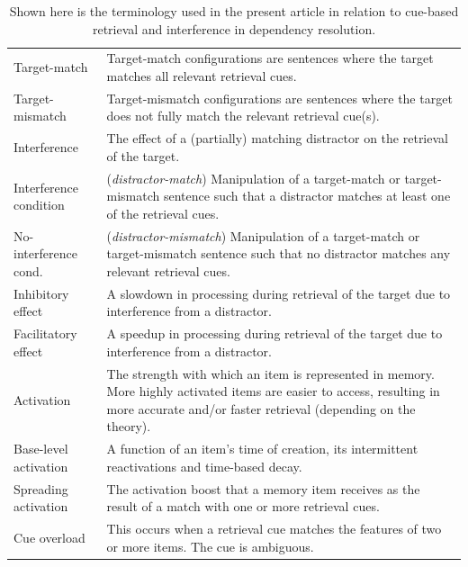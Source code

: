 \documentclass{cambridge7A}\usepackage[]{graphicx}\usepackage[]{color}
\begin{document}
\begin{subappendices}
\begin{table}[!htbp]
\begin{center}
{\begin{tabular}{p{4cm}p{6cm}}
Target-match  		  & Target-match configurations are sentences where the target matches all relevant retrieval cues. \\
Target-mismatch 	  & Target-mismatch configurations are sentences where the target does not fully match the relevant retrieval cue(s). \\
Interference        & The effect of a (partially) matching distractor on the retrieval of the target. \\
Interference condition     & (\emph{distractor-match}) Manipulation of a target-match or target-mismatch sentence such that a distractor matches at least one of the retrieval cues. \\
No-interference cond.     & (\emph{distractor-mismatch}) Manipulation of a target-match or target-mismatch sentence such that no distractor matches any relevant retrieval cues. \\
Inhibitory effect   & A slowdown in processing during retrieval of the target due to interference from a distractor. \\
Facilitatory effect & A speedup in processing during retrieval of the target due to interference from a distractor. \\
Activation          & The strength with which an item is represented in memory. More highly activated items are easier to access, resulting in more accurate and/or faster retrieval (depending on the theory). \\
Base-level activation & A function of an item's time of creation, its intermittent reactivations and time-based decay. \\
Spreading activation & The activation boost that a memory item receives as the result of a match with one or more retrieval cues. \\
Cue overload        & This occurs when a retrieval cue matches the features of two or more items. The cue is ambiguous. \\
\hline
\end{tabular}
}
\caption{Shown  here is the terminology used in the present article in relation to cue-based retrieval and interference in dependency resolution.}\label{tab:definitionsCBR}
\end{center}
\end{table}




\end{subappendices}
\end{document}

